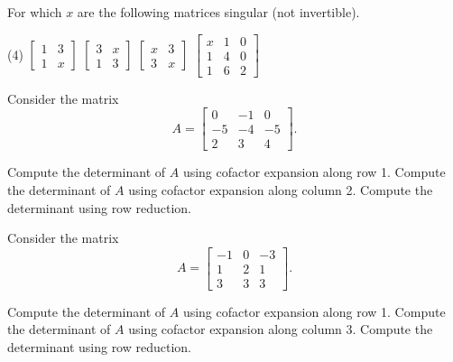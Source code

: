 \begin{exercise}\ansMark%
For which $x$ are the following matrices singular (not invertible).
\begin{tasks}(4)
\task
$\begin{bmatrix}
1 & 3 \\
1 & x
\end{bmatrix}$
\task
$\begin{bmatrix}
3 & x \\
1 & 3
\end{bmatrix}$
\task
$\begin{bmatrix}
x & 3 \\
3 & x
\end{bmatrix}$
\task
$\begin{bmatrix}
x & 1 & 0 \\
1 & 4 & 0 \\
1 & 6 & 2
\end{bmatrix}$
\end{tasks}
\end{exercise}

\begin{exercise}\ansMark%
Consider the matrix
\begin{equation*}
A = \begin{bmatrix}
0 & -1 & 0 \\ -5 & -4 & -5 \\ 2 & 3 & 4
\end{bmatrix}.
\end{equation*}
\begin{tasks}
\task Compute the determinant of $A$ using cofactor expansion along row 1.
\task Compute the determinant of $A$ using cofactor expansion along column 2.
\task Compute the determinant using row reduction.
\end{tasks}
\end{exercise}
%

\begin{exercise}\ansMark%
Consider the matrix
\begin{equation*}
A = \begin{bmatrix}
-1 & 0 & -3 \\ 1 & 2 & 1 \\ 3 & 3 & 3
\end{bmatrix}.
\end{equation*}
\begin{tasks}
\task Compute the determinant of $A$ using cofactor expansion along row 1.
\task Compute the determinant of $A$ using cofactor expansion along column 3.
\task Compute the determinant using row reduction.
\end{tasks}
\end{exercise}
%


